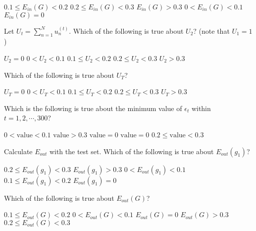 \documentclass[a4paper,10pt]{exam}
\begin{document}
\begin{questions}
\begin{checkboxes}
	\choice $0.1 \le E_{in}(G) < 0.2$
	\choice $0.2 \le E_{in}(G) < 0.3$
	\choice $E_{in}(G) > 0.3$
	\choice $0 < E_{in}(G) < 0.1$
	\CorrectChoice $E_{in}(G) = 0$\\
\end{checkboxes}

\question Let $U_t = \sum_{n=1}^N u_n^{(t)}$. Which of the following is true about $U_2$? (note that $U_1=1$)

\begin{checkboxes}
	\choice $U_2 = 0$
	\choice $0 < U_2 < 0.1$
	\choice $0.1 \le U_2 < 0.2$
	\choice $0.2 \le U_2 < 0.3$
	\CorrectChoice $U_2 > 0.3$\\
\end{checkboxes}

\question Which of the following is true about $U_T$?

\begin{checkboxes}
	\choice $U_T = 0$
	\CorrectChoice $0 < U_T < 0.1$
	\choice $0.1 \le U_T < 0.2$
	\choice $0.2 \le U_T < 0.3$
	\choice $U_T > 0.3$\\
\end{checkboxes}
	
\question Which is the following is true about the minimum value of $\epsilon_t$ within $t = 1, 2, \cdots, 300$?

\begin{checkboxes}
	\choice $0 < \mbox{value} < 0.1$
	\choice $\mbox{value} > 0.3$
	\choice $\mbox{value} = 0$
	\CorrectChoice $\mbox{value} = 0$
	\choice $0.2 \le \mbox{value} < 0.3$  \\
\end{checkboxes}

\question Calculate $E_{out}$ with the test set. Which of the following is true about $E_{out}(g_1)$?

\begin{checkboxes}
	\CorrectChoice $0.2 \le E_{out}(g_1) < 0.3$
	\choice $E_{out}(g_1) > 0.3$
	\choice $0 < E_{out}(g_1) < 0.1$
	\choice $0.1 \le E_{out}(g_1) < 0.2$
	\choice $E_{out}(g_1) = 0$\\
\end{checkboxes}

\question Which of the following is true about $E_{out}(G)$?

\begin{checkboxes}
	\CorrectChoice $0.1 \le E_{out}(G) < 0.2$
	\choice  $0 < E_{out}(G) < 0.1$
	\choice $E_{out}(G) = 0$
	\choice $E_{out}(G) > 0.3$
	\choice $0.2 \le E_{out}(G) < 0.3$\\
\end{checkboxes}


\end{questions}
\end{document}
